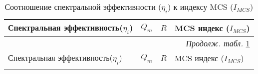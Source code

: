 \begin{longtable}{|l|l|l|l|}
\caption{Соотношение спектральной эффективности ($\eta_{i}$) к индексу MCS ($I_{MCS}$)}\label{MCS_spectr} 
\hline \hline 
Спектральная эффективность($\eta_{i}$) & $Q_{m}$ & $R$        & MCS индекс ($I_{MCS}$) \\ \hline 



    \endfirsthead   \multicolumn{4}{r}{{\itshape Продолж. табл.} \ref{MCS_spectr}}\\
    \hline
Спектральная эффективность($\eta_{i}$) & $Q_{m}$ & $R$        & MCS индекс ($I_{MCS}$)   \\ \hline
        
                                              \endhead %
 
                                              \endfoot        \hline
                                              \endlastfoot






\end{longtable}
